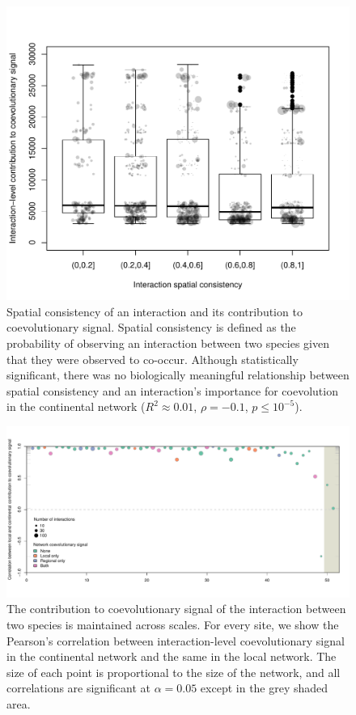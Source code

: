 \clearpage

\begin{figure}[htbp]
\centering
\includegraphics{../figures/figure3.pdf}
\caption{Spatial consistency of an interaction and its contribution to
coevolutionary signal. Spatial consistency is defined as the probability
of observing an interaction between two species given that they were
observed to co-occur. Although statistically significant, there was no
biologically meaningful relationship between spatial consistency and an
interaction's importance for coevolution in the continental network
(\(R^2 \approx 0.01\), \(\rho = -0.1\), \(p \leq 10^{-5}\)).}
\end{figure}

\clearpage

\begin{figure}[htbp]
\centering
\includegraphics{../figures/figure2.pdf}
\caption{The contribution to coevolutionary signal of the interaction
between two species is maintained across scales. For every site, we show
the Pearson's correlation between interaction-level coevolutionary
signal in the continental network and the same in the local network. The
size of each point is proportional to the size of the network, and all
correlations are significant at \(\alpha = 0.05\) except in the grey
shaded area.}
\end{figure}

\clearpage

